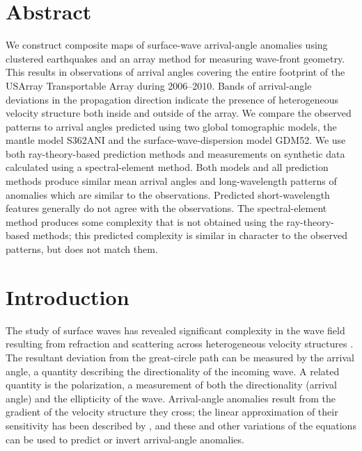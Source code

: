 \documentclass[12pt,oneside]{book}
\begin{document}
\section*{Abstract}
We construct composite maps of surface-wave arrival-angle anomalies using clustered earthquakes and an array method for measuring wave-front geometry. This results in observations of arrival angles covering the entire footprint of the USArray Transportable Array during 2006--2010. Bands of arrival-angle deviations in the propagation direction indicate the presence of heterogeneous velocity structure both inside and outside of the array. We compare the observed patterns to arrival angles predicted using two global tomographic models, the mantle model S362ANI and the surface-wave-dispersion model GDM52. We use both ray-theory-based prediction methods and measurements on synthetic data calculated using a spectral-element method. Both models and all prediction methods produce similar mean arrival angles and long-wavelength patterns of anomalies which are similar to the observations. Predicted short-wavelength features generally do not agree with the observations. The spectral-element method produces some complexity that is not obtained using the ray-theory-based methods; this predicted complexity is similar in character to the observed patterns, but does not match them. 
%

%
\section{Introduction}
The study of surface waves has revealed significant complexity in the wave field resulting from refraction and scattering across heterogeneous velocity structures \citep[e.g.,][]{Mastersetal1984, LayKanamori1985}. The resultant deviation from the great-circle path can be measured by the arrival angle, a quantity describing the directionality of the incoming wave. A related quantity is the polarization, a measurement of both the directionality (arrival angle) and the ellipticity of the wave. Arrival-angle anomalies result from the gradient of the velocity structure they cross; the linear approximation of their sensitivity has been described by \citet{WoodhouseWong1986}, and these and other variations of the equations \citep[e.g.,][]{Larson1998} can be used to predict or invert arrival-angle anomalies.
\end{document}
